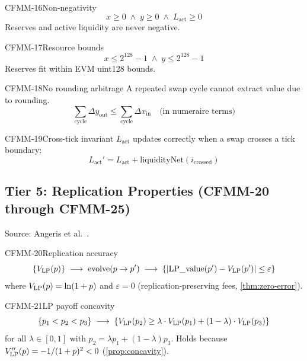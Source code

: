 \begin{invariant}{CFMM-16}{Non-negativity}
\[
  x \geq 0 \;\land\; y \geq 0 \;\land\; L_{\text{act}} \geq 0
\]
Reserves and active liquidity are never negative.
\end{invariant}

\begin{invariant}{CFMM-17}{Resource bounds}
\[
  x \leq 2^{128} - 1 \;\land\; y \leq 2^{128} - 1
\]
Reserves fit within EVM uint128 bounds.
\end{invariant}

\begin{invariant}{CFMM-18}{No rounding arbitrage}
A repeated swap cycle cannot extract value due to rounding.
\[
  \sum_{\text{cycle}} \Delta y_{\text{out}} \leq \sum_{\text{cycle}} \Delta x_{\text{in}}
  \quad \text{(in numeraire terms)}
\]
\end{invariant}

\begin{invariant}{CFMM-19}{Cross-tick invariant}
$L_{\text{act}}$ updates correctly when a swap crosses a tick boundary:
\[
  L_{\text{act}}' = L_{\text{act}} + \text{liquidityNet}(i_{\text{crossed}})
\]
\end{invariant}

\subsection{Tier 5: Replication Properties (CFMM-20 through CFMM-25)}

Source: Angeris et al.\ \cite{angeris2021replicating,angeris2023geometry}.

\begin{invariant}{CFMM-20}{Replication accuracy}
\[
  \{V_{\mathrm{LP}}(p)\} \;\longrightarrow\; \text{evolve}(p \to p')
  \;\longrightarrow\; \{|\text{LP\_value}(p') - V_{\mathrm{LP}}(p')| \leq \varepsilon\}
\]
where $V_{\mathrm{LP}}(p) = \ln(1+p)$ and $\varepsilon = 0$ (replication-preserving fees,
\cref{thm:zero-error}).
\end{invariant}

\begin{invariant}{CFMM-21}{LP payoff concavity}
\[
  \{p_1 < p_2 < p_3\} \;\longrightarrow\;
  \{V_{\mathrm{LP}}(p_2) \geq \lambda \cdot V_{\mathrm{LP}}(p_1) + (1-\lambda) \cdot V_{\mathrm{LP}}(p_3)\}
\]
for all $\lambda \in [0,1]$ with $p_2 = \lambda p_1 + (1-\lambda) p_3$.
Holds because $V_{\mathrm{LP}}''(p) = -1/(1+p)^2 < 0$ (\cref{prop:concavity}).
\end{invariant}


